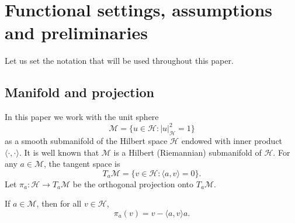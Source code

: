 \documentclass[reqno]{amsart}
\begin{document}
\section{Functional settings, assumptions and preliminaries}
Let us set the notation that will be used throughout this paper.

\subsection{Manifold and projection}

In this paper we work with the unit sphere
\[
\mathcal{M} = \{ u \in \mathcal{H} : |u|_{\mathcal{H}}^{2} = 1\}
\]
as a smooth submanifold of the Hilbert space $\mathcal{H}$ endowed with inner product
$\langle\cdot,\cdot\rangle$. It is well known that $\mathcal{M}$ is a Hilbert
(Riemannian) submanifold of $\mathcal{H}$. For any $a \in \mathcal{M}$, the tangent
space is
\[
T_{a}\mathcal{M} = \{ v \in \mathcal{H} : \langle a, v \rangle = 0 \}.
\]
Let $\pi_{a} : \mathcal{H} \longrightarrow T_{a}\mathcal{M}$
be the orthogonal projection onto $T_a\mathcal{M}$.

\begin{lemma}
\label{lem-orthogonal projection}
If $a \in \mathcal{M}$, then for all $v \in \mathcal{H}$,
\[
\pi_{a}(v) = v - \langle a, v \rangle a.
\]
\end{lemma}
\end{document}
